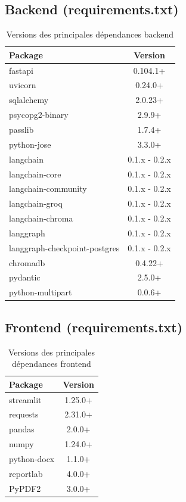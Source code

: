 \subsection{Backend (requirements.txt)}
\begin{table}[h]
\centering
\begin{tabular}{|l|c|}
\hline
\textbf{Package} & \textbf{Version} \\
\hline
fastapi & 0.104.1+ \\
\hline
uvicorn & 0.24.0+ \\
\hline
sqlalchemy & 2.0.23+ \\
\hline
psycopg2-binary & 2.9.9+ \\
\hline
passlib & 1.7.4+ \\
\hline
python-jose & 3.3.0+ \\
\hline
langchain & 0.1.x - 0.2.x \\
\hline
langchain-core & 0.1.x - 0.2.x \\
\hline
langchain-community & 0.1.x - 0.2.x \\
\hline
langchain-groq & 0.1.x - 0.2.x \\
\hline
langchain-chroma & 0.1.x - 0.2.x \\
\hline
langgraph & 0.1.x - 0.2.x \\
\hline
langgraph-checkpoint-postgres & 0.1.x - 0.2.x \\
\hline
chromadb & 0.4.22+ \\
\hline
pydantic & 2.5.0+ \\
\hline
python-multipart & 0.0.6+ \\
\hline
\end{tabular}
\caption{Versions des principales dépendances backend}
\end{table}

\subsection{Frontend (requirements.txt)}
\begin{table}[h]
\centering
\begin{tabular}{|l|c|}
\hline
\textbf{Package} & \textbf{Version} \\
\hline
streamlit & 1.25.0+ \\
\hline
requests & 2.31.0+ \\
\hline
pandas & 2.0.0+ \\
\hline
numpy & 1.24.0+ \\
\hline
python-docx & 1.1.0+ \\
\hline
reportlab & 4.0.0+ \\
\hline
PyPDF2 & 3.0.0+ \\
\hline
\end{tabular}
\caption{Versions des principales dépendances frontend}
\end{table}

